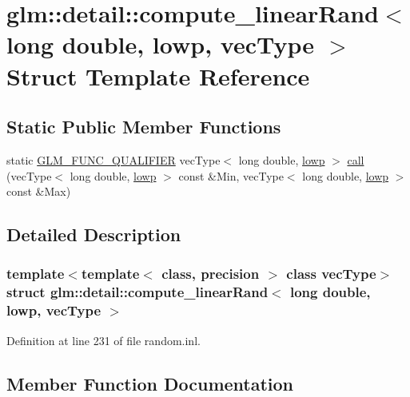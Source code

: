 \hypertarget{structglm_1_1detail_1_1compute__linear_rand_3_01long_01double_00_01lowp_00_01vec_type_01_4}{}\section{glm\+::detail\+::compute\+\_\+linear\+Rand$<$ long double, lowp, vec\+Type $>$ Struct Template Reference}
\label{structglm_1_1detail_1_1compute__linear_rand_3_01long_01double_00_01lowp_00_01vec_type_01_4}
\subsection*{Static Public Member Functions}
\begin{DoxyCompactItemize}
\item 
static \mbox{\hyperlink{setup_8hpp_a33fdea6f91c5f834105f7415e2a64407}{G\+L\+M\+\_\+\+F\+U\+N\+C\+\_\+\+Q\+U\+A\+L\+I\+F\+I\+ER}} vec\+Type$<$ long double, \mbox{\hyperlink{namespaceglm_a0f04f086094c747d227af4425893f545ae161af3fc695e696ce3bf69f7332bc2d}{lowp}} $>$ \mbox{\hyperlink{structglm_1_1detail_1_1compute__linear_rand_3_01long_01double_00_01lowp_00_01vec_type_01_4_a946041e54f74d77bc7ca81ae69eaaffc}{call}} (vec\+Type$<$ long double, \mbox{\hyperlink{namespaceglm_a0f04f086094c747d227af4425893f545ae161af3fc695e696ce3bf69f7332bc2d}{lowp}} $>$ const \&Min, vec\+Type$<$ long double, \mbox{\hyperlink{namespaceglm_a0f04f086094c747d227af4425893f545ae161af3fc695e696ce3bf69f7332bc2d}{lowp}} $>$ const \&Max)
\end{DoxyCompactItemize}


\subsection{Detailed Description}
\subsubsection*{template$<$template$<$ class, precision $>$ class vec\+Type$>$\newline
struct glm\+::detail\+::compute\+\_\+linear\+Rand$<$ long double, lowp, vec\+Type $>$}



Definition at line 231 of file random.\+inl.



\subsection{Member Function Documentation}
\mbox{\label{structglm_1_1detail_1_1compute__linear_rand_3_01long_01double_00_01lowp_00_01vec_type_01_4_a946041e54f74d77bc7ca81ae69eaaffc}} 
